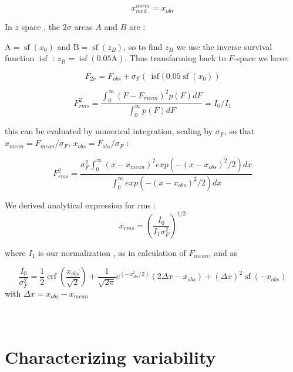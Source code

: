 \documentclass[fleqn,usenatbib]{mnras}  %
\DeclareMathOperator\erf{erf}
\DeclareMathOperator\sf{sf}
\DeclareMathOperator\isf{isf}
\begin{document}
\begin{equation}
x_{med}^{norm} = x_{obs}
\end{equation}


\bigskip

In $z$  space , the $2\sigma$ areas  $A$ and $B$ are :

$\text{A} = \sf(x_{0})$ and $\text{B} = \sf(z_{B})$, so to find  $z_{B}$ we use the  inverse survival function $\isf$ : $z_{B} = \isf(0.05 \text{A})$. Thus transforming back to $F$-space we have:

\begin{equation}
F_{2\sigma} = F_{obs} + \sigma_{F} \left(\, \isf (\, 0.05 \sf (x_{0})  \right)
\end{equation}

\bigskip


\begin{equation}
F_{rms}^{2} = \frac{\int _{0} ^ {\infty}{(F-F_{mean})^{2} p(F) dF}}{\int _{0} ^ {\infty}{p(F) dF}} = I_{0} / I_{1}
\end{equation}

this can be evaluated by numerical integration, scaling by $\sigma_{F}$, so that $x_{mean} = F_{mean} / \sigma_{F}$, $x_{obs} = F_{obs} / \sigma_{F}$ : 

\begin{equation}
F_{rms}^{2} = \frac{\sigma_{F}^{2} \int_{0}^{\infty} {(x-x_{mean})^{2} exp(-(x-x_{obs})^{2} / 2 ) dx }}  {\int_{0}^{\infty} {exp(-(x-x_{obs})^{2} / 2 ) dx }}
\end{equation}

We derived analytical expression for rms :
\begin{equation}
x_{rms} = (\frac{I_{0}}{I_{1} \sigma_{F}^{2}})^{1/2}
\end{equation}

where $I_{1}$ is our normalization , as in calculation of $F_{mean}$, and as 


\begin{equation}
\frac{I_{0}}{ \sigma_{F}^{2}} = \frac{1}{2} \erf\left(\frac{x_{obs}}{\sqrt{2}}\right) + \frac{1}{\sqrt{2\pi}} e^{(-x_{obs}^{2} / 2)} (2 \Delta x - x_{obs}) + (\Delta x)^{2} \sf(-x_{obs})
\end{equation}
with  $\Delta x = x_{obs} - x_{mean}$

\section{\\ Characterizing variability}
\label{App:AppendixB}
\end{document}

